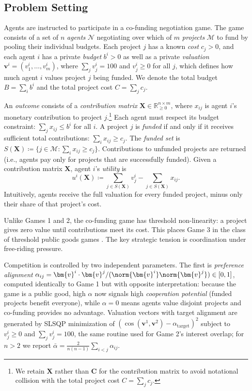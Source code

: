 \subsection{Problem Setting}
\label{sec:game_3_problem_setting}

Agents are instructed to participate in a co-funding negotiation game.
The game consists of a set of $n$ \emph{agents} $\mathcal{N}$ negotiating over which of $m$ \emph{projects} $\mathcal{M}$ to fund by pooling their individual budgets.
Each project $j$ has a known \emph{cost} $c_j > 0$, and each agent $i$ has a private \emph{budget} $b^{i} > 0$ as well as a private \emph{valuation} $\bm{v}^{i} = (v^{i}_{1}, \dots, v^{i}_{m})$, where $\sum_j v^{i}_{j} = 100$ and $v^{i}_{j} \geq 0$ for all $j$, which defines how much agent $i$ values project $j$ being funded.
We denote the total budget $B = \sum_i b^i$ and the total project cost $C = \sum_j c_j$.

An \emph{outcome} consists of a \emph{contribution matrix} $\bm{X} \in \mathbb{R}_{\geq 0}^{n \times m}$, where $x_{ij}$ is agent $i$'s monetary contribution to project $j$.\footnote{We retain $\bm{X}$ rather than $\bm{C}$ for the contribution matrix to avoid notational collision with the total project cost $C = \sum_j c_j$.}
Each agent must respect its budget constraint: $\sum_{j} x_{ij} \leq b^i$ for all $i$.
A project $j$ is \emph{funded} if and only if it receives sufficient total contributions: $\sum_{i} x_{ij} \geq c_j$.
The \emph{funded set} is $S(\bm{X}) \coloneqq \{j \in \mathcal{M} : \sum_{i} x_{ij} \geq c_j\}$.
Contributions to unfunded projects are returned (i.e., agents pay only for projects that are successfully funded).
Given a contribution matrix $\bm{X}$, agent $i$'s \emph{utility} is
\begin{equation}
    u^i(\bm{X}) \coloneqq \sum_{j \in S(\bm{X})} v^{i}_{j} - \sum_{j \in S(\bm{X})} x_{ij}.
\end{equation}
Intuitively, agents receive the full valuation for every funded project, minus only their share of that project's cost.

Unlike Games 1 and 2, the co-funding game has threshold non-linearity: a project gives zero value until contributions meet its cost.
This places Game 3 in the class of threshold public goods games \citep{palfrey1984testing}.
The key strategic tension is coordination under free-riding pressure.

Competition is controlled by two independent parameters.
The first is \emph{preference alignment} $\alpha_{ij} = \bm{v}^{i} \cdot \bm{v}^{j} / (\norm{\bm{v}^{i}} \norm{\bm{v}^{j}}) \in [0,1]$, computed identically to Game 1 but with opposite interpretation: because the game is a public good, high $\alpha$ now signals high \emph{cooperation potential} (funded projects benefit everyone), while $\alpha = 0$ means agents value disjoint projects and co-funding provides no advantage.
Valuation vectors with target alignment are generated by SLSQP minimization of $(\cos(\bm{v}^1, \bm{v}^2) - \alpha_{\text{target}})^2$ subject to $v^i_j \geq 0$ and $\sum_j v^i_j = 100$, the same routine used for Game 2's interest overlap; for $n > 2$ we report $\bar{\alpha} = \frac{2}{n(n-1)} \sum_{i < j} \alpha_{ij}$.

